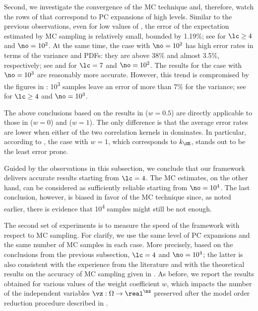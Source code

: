Second, we investigate the convergence of the \ac{MC} technique and, therefore,
watch the rows of  that correspond to \ac{PC}
expansions of high levels. Similar to the previous observations, even for low
values of \no, the error of the expectation estimated by \ac{MC} sampling is
relatively small, bounded by 1.19\%; see \error{\expectation} for $\lc \geq 4$
and $\no = 10^2$. At the same time, the case with $\no = 10^2$ has high error
rates in terms of the variance and \acp{PDF}: they are above 38\% and almost
3.5\%, respectively; see \error{\variance} and  for $\lc = 7$ and $\no
= 10^2$. The results for the case with $\no = 10^3$ are reasonably more
accurate. However, this trend is compromised by the figures in
: 10\textsuperscript{3} samples leave an error
of more than 7\% for the variance; see \error{\variance} for $\lc \geq 4$ and
$\no = 10^3$.

The above conclusions based on the results in
 ($w = 0.5$) are directly applicable to those
in  ($w = 0$) and
 ($w = 1$). The only difference is that the
average error rates are lower when either of the two correlation kernels in
 dominates. In particular, according to
\error{\variance}, the case with $w = 1$, which corresponds to $k_\SE$, stands
out to be the least error prone.

Guided by the observations in this subsection, we conclude that our framework
delivers accurate results starting from $\lc = 4$. The \ac{MC} estimates, on the
other hand, can be considered as sufficiently reliable starting from $\no =
10^4$. The last conclusion, however, is biased in favor of the \ac{MC} technique
since, as noted earlier, there is evidence that 10\textsuperscript{4} samples
might still be not enough.


The second set of experiments is to measure the speed of the framework with
respect to \ac{MC} sampling. For clarify, we use the same level of \ac{PC}
expansions and the same number of \ac{MC} samples in each case. More precisely,
based on the conclusions from the previous subsection, $\lc = 4$ and $\no =
10^4$; the latter is also consistent with the experience from the literature
\cite{ghanta2006, bhardwaj2008, huang2009a, shen2009, lee2013} and with the
theoretical results on the accuracy of \ac{MC} sampling given in
\cite{diaz-emparanza2002}. As before, we report the results obtained for various
values of the weight coefficient $w$, which impacts the number of the
independent variables $\vz: \Omega \to \real^\nz$ preserved after the model
order reduction procedure described in .

